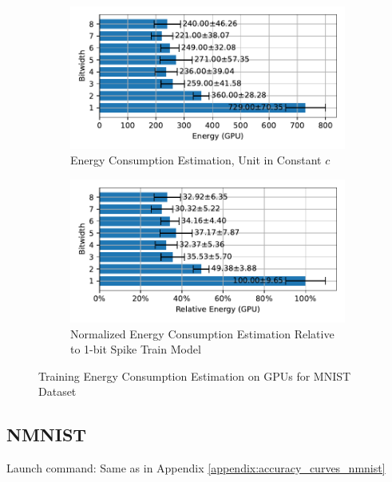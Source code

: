         \begin{figure}[H]
            \centering
            \begin{subfigure}[H]{0.6\textwidth}
                \includegraphics[width=\textwidth]{../standard/MNIST/plots/mnist_train_energy_gpu_horizontal.pdf}
                \caption{Energy Consumption Estimation, Unit in Constant $c$}
            \end{subfigure}
            \hfill
            \begin{subfigure}[H]{0.6\textwidth}
                \includegraphics[width=\textwidth]{../standard/MNIST/plots/mnist_train_relative_energy_gpu_horizontal.pdf}
                \caption{Normalized Energy Consumption Estimation Relative to 1-bit Spike Train Model}
            \end{subfigure}
            \caption{Training Energy Consumption Estimation on GPUs for MNIST Dataset}
        \end{figure}

    \subsection{NMNIST}
    \label{appendix:energy_gpu_nmnist}
        Launch command: Same as in Appendix \ref{appendix:accuracy_curves_nmnist}

